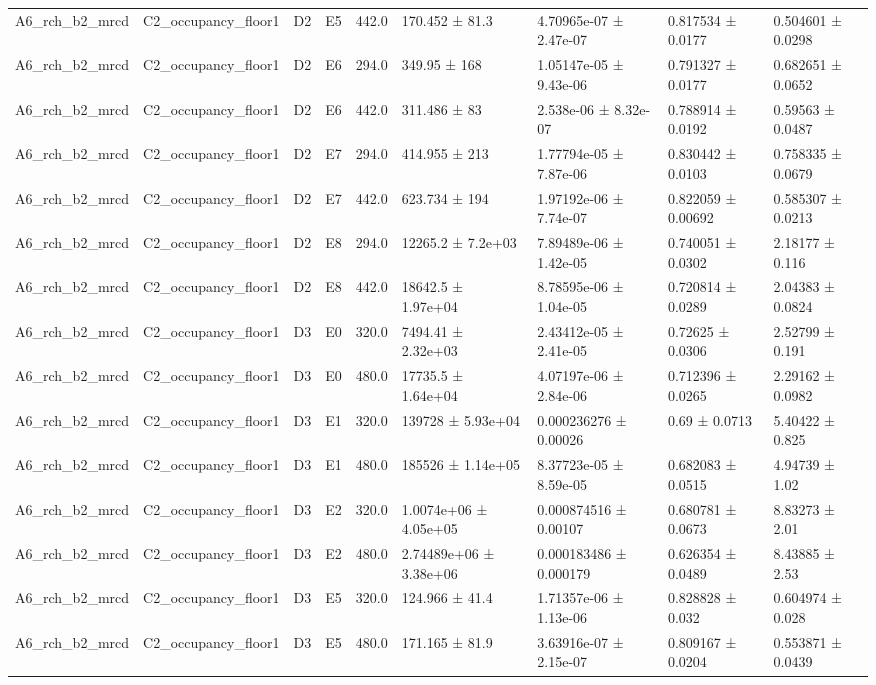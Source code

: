 \begin{table}
\begin{tabular}{lllllllll}
A6\_rch\_b2\_mrcd & C2\_occupancy\_floor1 & D2 & E5 & 442.0 & 170.452 ± 81.3 & 4.70965e-07 ± 2.47e-07 & 0.817534 ± 0.0177 & 0.504601 ± 0.0298 \\
A6\_rch\_b2\_mrcd & C2\_occupancy\_floor1 & D2 & E6 & 294.0 & 349.95 ± 168 & 1.05147e-05 ± 9.43e-06 & 0.791327 ± 0.0177 & 0.682651 ± 0.0652 \\
A6\_rch\_b2\_mrcd & C2\_occupancy\_floor1 & D2 & E6 & 442.0 & 311.486 ± 83 & 2.538e-06 ± 8.32e-07 & 0.788914 ± 0.0192 & 0.59563 ± 0.0487 \\
A6\_rch\_b2\_mrcd & C2\_occupancy\_floor1 & D2 & E7 & 294.0 & 414.955 ± 213 & 1.77794e-05 ± 7.87e-06 & 0.830442 ± 0.0103 & 0.758335 ± 0.0679 \\
A6\_rch\_b2\_mrcd & C2\_occupancy\_floor1 & D2 & E7 & 442.0 & 623.734 ± 194 & 1.97192e-06 ± 7.74e-07 & 0.822059 ± 0.00692 & 0.585307 ± 0.0213 \\
A6\_rch\_b2\_mrcd & C2\_occupancy\_floor1 & D2 & E8 & 294.0 & 12265.2 ± 7.2e+03 & 7.89489e-06 ± 1.42e-05 & 0.740051 ± 0.0302 & 2.18177 ± 0.116 \\
A6\_rch\_b2\_mrcd & C2\_occupancy\_floor1 & D2 & E8 & 442.0 & 18642.5 ± 1.97e+04 & 8.78595e-06 ± 1.04e-05 & 0.720814 ± 0.0289 & 2.04383 ± 0.0824 \\
A6\_rch\_b2\_mrcd & C2\_occupancy\_floor1 & D3 & E0 & 320.0 & 7494.41 ± 2.32e+03 & 2.43412e-05 ± 2.41e-05 & 0.72625 ± 0.0306 & 2.52799 ± 0.191 \\
A6\_rch\_b2\_mrcd & C2\_occupancy\_floor1 & D3 & E0 & 480.0 & 17735.5 ± 1.64e+04 & 4.07197e-06 ± 2.84e-06 & 0.712396 ± 0.0265 & 2.29162 ± 0.0982 \\
A6\_rch\_b2\_mrcd & C2\_occupancy\_floor1 & D3 & E1 & 320.0 & 139728 ± 5.93e+04 & 0.000236276 ± 0.00026 & 0.69 ± 0.0713 & 5.40422 ± 0.825 \\
A6\_rch\_b2\_mrcd & C2\_occupancy\_floor1 & D3 & E1 & 480.0 & 185526 ± 1.14e+05 & 8.37723e-05 ± 8.59e-05 & 0.682083 ± 0.0515 & 4.94739 ± 1.02 \\
A6\_rch\_b2\_mrcd & C2\_occupancy\_floor1 & D3 & E2 & 320.0 & 1.0074e+06 ± 4.05e+05 & 0.000874516 ± 0.00107 & 0.680781 ± 0.0673 & 8.83273 ± 2.01 \\
A6\_rch\_b2\_mrcd & C2\_occupancy\_floor1 & D3 & E2 & 480.0 & 2.74489e+06 ± 3.38e+06 & 0.000183486 ± 0.000179 & 0.626354 ± 0.0489 & 8.43885 ± 2.53 \\
A6\_rch\_b2\_mrcd & C2\_occupancy\_floor1 & D3 & E5 & 320.0 & 124.966 ± 41.4 & 1.71357e-06 ± 1.13e-06 & 0.828828 ± 0.032 & 0.604974 ± 0.028 \\
A6\_rch\_b2\_mrcd & C2\_occupancy\_floor1 & D3 & E5 & 480.0 & 171.165 ± 81.9 & 3.63916e-07 ± 2.15e-07 & 0.809167 ± 0.0204 & 0.553871 ± 0.0439 \\

\end{tabular}
\end{table}
